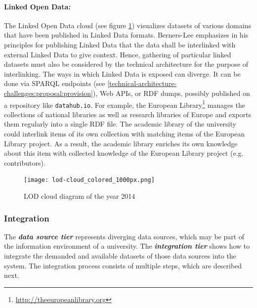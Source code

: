 \documentclass{article}
\begin{document}
\paragraph{Linked Open Data:} The Linked Open Data cloud (see figure \ref{fig:lod-cloud-diagram}) visualizes datasets of various domains that have been published in Linked Data formats\cite{_linking_????}. Berners-Lee emphasizes in his principles for publishing Linked Data that the data shall be interlinked with external Linked Data to give context. Hence,  gathering of particular linked datasets must also be considered by the technical architecture for the purpose of interlinking. The ways in which Linked Data is exposed can diverge. It can be done via SPARQL endpoints (see \ref{technical-architecture-challenges:proposal:provision}), Web APIs, or RDF dumps, possibly published on a repository like \texttt{datahub.io}. For example, the European Library\footnote{\url{http://theeuropeanlibrary.org}} manages the collections of national libraries as well as research libraries of Europe and exports them regularly into a single RDF file. The academic library of the university could interlink items of its own collection with matching items of the European Library project. As a result, the academic library enriches its own knowledge about this item with collected knowledge of the European Library project (e.g. contributors).

\begin{figure}[t]
\centering \texttt{[image: lod-cloud\_colored\_1000px.png]}
\caption{LOD cloud diagram of the year 2014}
\label{fig:lod-cloud-diagram}
\end{figure}


\subsubsection{Integration}
\label{technical-architecture-challenges:proposal:integration}
The \textit{\textbf{data source tier}} represents diverging data sources, which may be part of the information environment of a university. The \textit{\textbf{integration tier}} shows how to integrate the demanded and available datasets of those data sources into the system. The integration process consists of multiple steps, which are described next.
\end{document}

